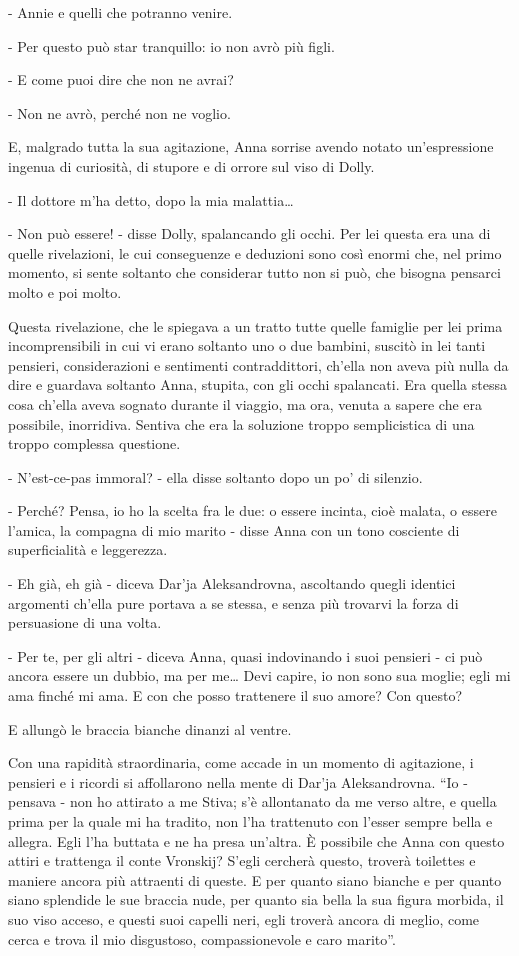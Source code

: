 - Annie e quelli che potranno venire. 

- Per questo può star tranquillo: io non avrò più figli. 

- E come puoi dire che non ne avrai? 

- Non ne avrò, perché non ne voglio. 

E, malgrado tutta la sua agitazione, Anna sorrise avendo notato un'espressione ingenua di curiosità, di stupore e di orrore sul viso di Dolly. 

- Il dottore m'ha detto, dopo la mia malattia\ldots{} 

- Non può essere! - disse Dolly, spalancando gli occhi. Per lei questa era una di quelle rivelazioni, le cui conseguenze e deduzioni sono così enormi che, nel primo momento, si sente soltanto che considerar tutto non si può, che bisogna pensarci molto e poi molto. 

Questa rivelazione, che le spiegava a un tratto tutte quelle famiglie per lei prima incomprensibili in cui vi erano soltanto uno o due bambini, suscitò in lei tanti pensieri, considerazioni e sentimenti contraddittori, ch'ella non aveva più nulla da dire e guardava soltanto Anna, stupita, con gli occhi spalancati. Era quella stessa cosa ch'ella aveva sognato durante il viaggio, ma ora, venuta a sapere che era possibile, inorridiva. Sentiva che era la soluzione troppo semplicistica di una troppo complessa questione. 

- N'est-ce-pas immoral? - ella disse soltanto dopo un po' di silenzio. 

- Perché? Pensa, io ho la scelta fra le due: o essere incinta, cioè malata, o essere l'amica, la compagna di mio marito - disse Anna con un tono cosciente di superficialità e leggerezza. 

- Eh già, eh già - diceva Dar'ja Aleksandrovna, ascoltando quegli identici argomenti ch'ella pure portava a se stessa, e senza più trovarvi la forza di persuasione di una volta. 

- Per te, per gli altri - diceva Anna, quasi indovinando i suoi pensieri - ci può ancora essere un dubbio, ma per me\ldots{} Devi capire, io non sono sua moglie; egli mi ama finché mi ama. E con che posso trattenere il suo amore? Con questo? 

E allungò le braccia bianche dinanzi al ventre. 

Con una rapidità straordinaria, come accade in un momento di agitazione, i pensieri e i ricordi si affollarono nella mente di Dar'ja Aleksandrovna. ``Io - pensava - non ho attirato a me Stiva; s'è allontanato da me verso altre, e quella prima per la quale mi ha tradito, non l'ha trattenuto con l'esser sempre bella e allegra. Egli l'ha buttata e ne ha presa un'altra. È possibile che Anna con questo attiri e trattenga il conte Vronskij? S'egli cercherà questo, troverà toilettes e maniere ancora più attraenti di queste. E per quanto siano bianche e per quanto siano splendide le sue braccia nude, per quanto sia bella la sua figura morbida, il suo viso acceso, e questi suoi capelli neri, egli troverà ancora di meglio, come cerca e trova il mio disgustoso, compassionevole e caro marito''. 

